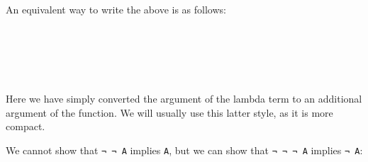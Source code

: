 An equivalent way to write the above is as follows:

\begin{fence}
\begin{code}%
\>[0]\AgdaSpace{}%
\AgdaSymbol{:}\AgdaSpace{}%
\AgdaSpace{}%
\AgdaSymbol{\{}\AgdaSpace{}%
\AgdaSymbol{:}\AgdaSpace{}%
\AgdaSymbol{\}}\<%
\\
\>[0][@{}l@{\AgdaIndent{0}}]%
\>[2]%
\>[76I]\<%
\\
\>[.][@{}l@{}]\<[76I]%
\>[4]\AgdaComment{-----}\<%
\\
%
\>[2]\AgdaSpace{}%
\AgdaSpace{}%
\AgdaSpace{}%
\<%
\\
\>[0]\AgdaSpace{}%
\AgdaSpace{}%
\AgdaSpace{}%
\AgdaSymbol{=}\AgdaSpace{}%
\AgdaSpace{}%
\<%
\end{code}
\end{fence}

Here we have simply converted the argument of the lambda term to an
additional argument of the function. We will usually use this latter
style, as it is more compact.

We cannot show that \texttt{¬\ ¬\ A} implies \texttt{A}, but we can show
that \texttt{¬\ ¬\ ¬\ A} implies \texttt{¬\ A}:

\begin{fence}
\begin{code}%
\>[0]\AgdaSpace{}%
\AgdaSymbol{:}\AgdaSpace{}%
\AgdaSpace{}%
\AgdaSymbol{\{}\AgdaSpace{}%
\AgdaSymbol{:}\AgdaSpace{}%
\AgdaSymbol{\}}\<%
\\
\>[0][@{}l@{\AgdaIndent{0}}]%
\>[2]%
\>[90I]\AgdaSpace{}%
\AgdaSpace{}%
\AgdaSpace{}%
\<%
\\
\>[.][@{}l@{}]\<[90I]%
\>[4]\AgdaComment{-------}\<%
\\
%
\>[2]\AgdaSpace{}%
\AgdaSpace{}%
\<%
\\
\>[0]\AgdaSpace{}%
%
\>[15]\AgdaSymbol{=}%
\>[18]\AgdaSpace{}%
\AgdaSpace{}%
\AgdaSpace{}%
\AgdaSpace{}%
\AgdaSymbol{(}\AgdaSpace{}%
\AgdaSymbol{)}\<%
\end{code}
\end{fence}

